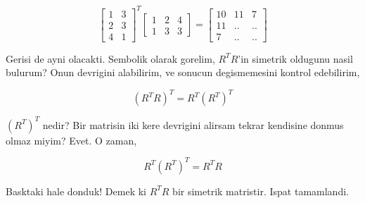 \documentclass[12pt,fleqn]{article}\usepackage{../common}
\begin{document}
$$ 
\left[\begin{array}{rr}
1 & 3 \\
2 & 3 \\
4 & 1 
\end{array}\right]^T
\left[\begin{array}{rrr}
1 & 2 & 4 \\
1 & 3 & 3 
\end{array}\right]
=
\left[\begin{array}{rrr}
10 & 11 & 7 \\
11 & .. & .. \\
7 & .. & ..
\end{array}\right]
 $$  

Gerisi de ayni olacakti. Sembolik olarak gorelim, $R^TR$'in simetrik
oldugunu nasil bulurum? Onun devrigini alabilirim, ve sonucun degismemesini
kontrol edebilirim,

$$ (R^TR)^T = R^T(R^T)^T $$

$(R^T)^T$ nedir? Bir matrisin iki kere devrigini alirsam tekrar kendisine
donmus olmaz miyim? Evet. O zaman, 

$$  R^T(R^T)^T = R^T R $$

Basktaki hale donduk! Demek ki $R^TR$ bir simetrik matristir. Ispat
tamamlandi. 
\end{document}
